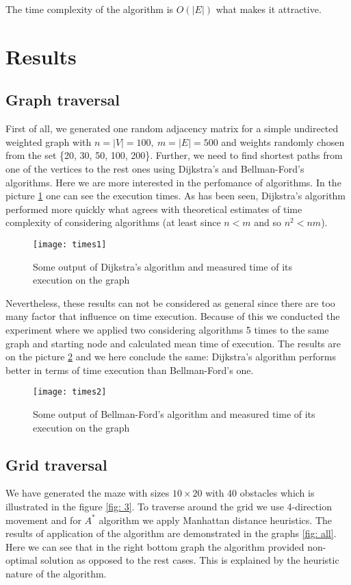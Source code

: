 \documentclass[12pt, bachelor, substylefile = algo_title.rtx]{disser}
\theoremstyle{definition}
\begin{document}
The time complexity of the algorithm is $O(|E|)$ what makes it attractive.

\section{Results}
\subsection{Graph traversal}
First of all, we generated one random adjacency matrix for a simple undirected weighted graph with $n = |V| = 100,\ m = |E| = 500$ and weights randomly chosen from the set \{20, 30, 50, 100, 200\}. Further, we need to find shortest paths from one of the vertices to the rest ones using Dijkstra's and Bellman-Ford's algorithms. Here we are more interested in the perfomance of algorithms. In the picture \ref{fig: 1} one can see the execution times. As has been seen, Dijkstra's algorithm performed more quickly what agrees with theoretical estimates of time complexity of considering algorithms (at least since $n < m$ and so $n^2 < nm$). 
\begin{figure}[!h]
\begin{center}
\texttt{[image: times1]}
\caption{Some output of Dijkstra's algorithm and measured time of its execution on the graph}
\label{fig: 1}
\end{center}
\end{figure}


Nevertheless, these results can not be considered as general since there are too many factor that influence on time execution. Because of this we conducted the experiment where we applied two considering algorithms 5 times to the same graph and starting node and calculated mean time of execution. The results are on the picture \ref{fig: 2} and we here conclude the same: Dijkstra's algorithm performs better in terms of time execution than Bellman-Ford's one.

\begin{figure}[!h]
\begin{center}
\texttt{[image: times2]}
\caption{Some output of Bellman-Ford's algorithm and measured time of its execution on the graph}
\label{fig: 2}
\end{center}
\end{figure}

\subsection{Grid traversal}
We have generated the maze with sizes $10\times20$ with 40 obstacles which is illustrated in the figure \ref{fig: 3}. To traverse around the grid we use 4-direction movement and for $A^*$ algorithm we apply Manhattan distance heuristics. The results of application of the algorithm are demonstrated in the graphs \ref{fig: all}. Here we can see that in the right bottom graph the algorithm provided non-optimal solution as opposed to the rest cases. This is explained by the heuristic nature of the algorithm.
\end{document}
